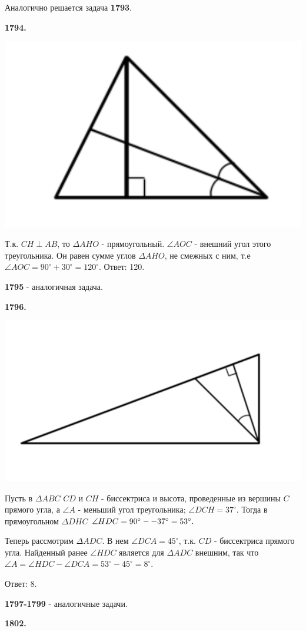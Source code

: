 Аналогично решается задача \textbf{1793}.

\textbf{1794.}

{\centering \includegraphics[width=0.4\linewidth]{Geometry/Content/11.png}
	
}

Т.к. $CH \perp AB$, то $\Delta AHO$ - прямоугольный. $\angle AOC$ - внешний угол этого треугольника. Он равен сумме углов $\Delta AHO$, не смежных с ним, т.е
$\angle AOC = 90^\circ + 30^\circ = 120^\circ$. \newline \null \hspace*{\fill} Ответ: 120.

\textbf{1795} - аналогичная задача.

\clearpage 

\textbf{1796.}

{\centering \includegraphics[width=0.5\linewidth]{Geometry/Content/12.png}
	
}

Пусть в $\Delta ABC$ $CD$ и $CH$ - биссектриса и высота, проведенные из вершины $C$ прямого угла, а $\angle A$ - меньший угол треугольника; $\angle DCH = 37^\circ$. Тогда в прямоугольном $\Delta DHC$ $\angle HDC = 90^\circ -\linebreak - 37^\circ = 53^\circ.$

Теперь рассмотрим $\Delta ADC$. В нем $\angle DCA = 45^\circ$, т.к. $CD$ - биссектриса прямого угла. Найденный ранее $\angle HDC$ является для $\Delta ADC$ внешним, так что $\angle A = \angle HDC - \angle DCA  = 53^\circ - 45^\circ = 8^\circ.$ 

\null \hspace*{\fill} Ответ: 8.

\textbf{1797-1799} - аналогичные задачи.

\textbf{1802.}

